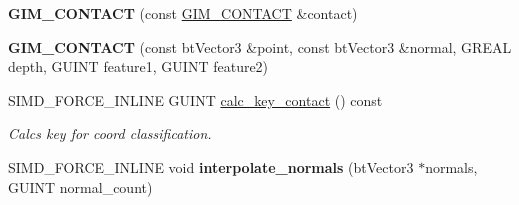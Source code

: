 \begin{DoxyCompactItemize}
\item 
\mbox{\label{classGIM__CONTACT_af2504893707107a602ccdcbf9af4c1ef}} 
{\bfseries G\+I\+M\+\_\+\+C\+O\+N\+T\+A\+CT} (const \hyperlink{classGIM__CONTACT}{G\+I\+M\+\_\+\+C\+O\+N\+T\+A\+CT} \&contact)
\item 
\mbox{\label{classGIM__CONTACT_ac27e6b6f50d458d5400fe135d85401bb}} 
{\bfseries G\+I\+M\+\_\+\+C\+O\+N\+T\+A\+CT} (const bt\+Vector3 \&point, const bt\+Vector3 \&normal, G\+R\+E\+AL depth, G\+U\+I\+NT feature1, G\+U\+I\+NT feature2)
\item 
\mbox{\label{classGIM__CONTACT_a81c1c924eef0edf8842762068d8dafc6}} 
S\+I\+M\+D\+\_\+\+F\+O\+R\+C\+E\+\_\+\+I\+N\+L\+I\+NE G\+U\+I\+NT \hyperlink{classGIM__CONTACT_a81c1c924eef0edf8842762068d8dafc6}{calc\+\_\+key\+\_\+contact} () const
\begin{DoxyCompactList}\small\item\em Calcs key for coord classification. \end{DoxyCompactList}\item 
\mbox{\label{classGIM__CONTACT_a3f2d3d46cf49b6d1ff3f2c8299a2c3ca}} 
S\+I\+M\+D\+\_\+\+F\+O\+R\+C\+E\+\_\+\+I\+N\+L\+I\+NE void {\bfseries interpolate\+\_\+normals} (bt\+Vector3 $\ast$normals, G\+U\+I\+NT normal\+\_\+count)
\end{DoxyCompactItemize}
